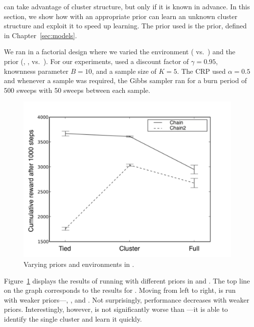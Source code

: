  can take advantage of
cluster structure, but only if it is known in advance.  In this
section, we show how  with an appropriate prior can learn an
unknown cluster structure and exploit it to speed up learning. The prior used is the  prior, defined in Chapter~\ref{sec:models}.


We ran  in a factorial design where we varied the environment
( vs.\ ) and the prior (, , vs.\ ).  For our
experiments,  used a discount factor of $\gamma = 0.95$,
knownness parameter $B=10$, and a sample size of $K=5$.  The
 CRP used $\alpha=0.5$ and whenever a
sample was required, the Gibbs sampler ran for a burn period of 500
sweeps with 50 sweeps between each sample.

\begin{figure}[t]
\begin{center}
\includegraphics[width=1.0\linewidth]{2x3}
\caption{Varying priors and environments in .}
\label{f:twobythree}
\end{center}
\end{figure}

Figure~\ref{f:twobythree} displays the results of running  with
different priors in  and .  The top line on the graph
corresponds to the results for .  Moving from left to right, 
is run with weaker priors---, , and .  Not
surprisingly, performance decreases with weaker priors.
Interestingly, however,  is not significantly worse than
---it is able to identify the single cluster and learn it quickly.

